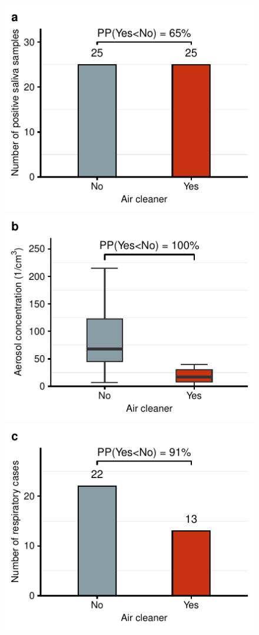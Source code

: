\documentclass[fleqn,11pt]{wlscirep}
\begin{document}
\begin{figure}[!htpb]
\centering
    \includegraphics{../../results/mol-data/saliva-by-study-condition.pdf}\hspace{.5cm}
    \includegraphics{../../results/env-data/aerosol-number-boxplot.pdf}
    \includegraphics{../../results/epi-data/cases_by_condition.pdf}\hspace{.5cm}

\end{figure}
\end{document}

